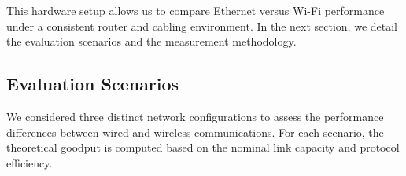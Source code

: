         \vspace{-0.1cm} %

        This hardware setup allows us to compare Ethernet versus Wi-Fi performance under a consistent router and cabling environment. 
        In the next section, we detail the evaluation scenarios and the measurement methodology.

    \subsection{Evaluation Scenarios} \label{subsec:evaluation-scenarios}

        We considered three distinct network configurations to assess the performance differences between wired and wireless communications. 
        For each scenario, the theoretical goodput is computed based on the nominal link capacity and protocol efficiency.

